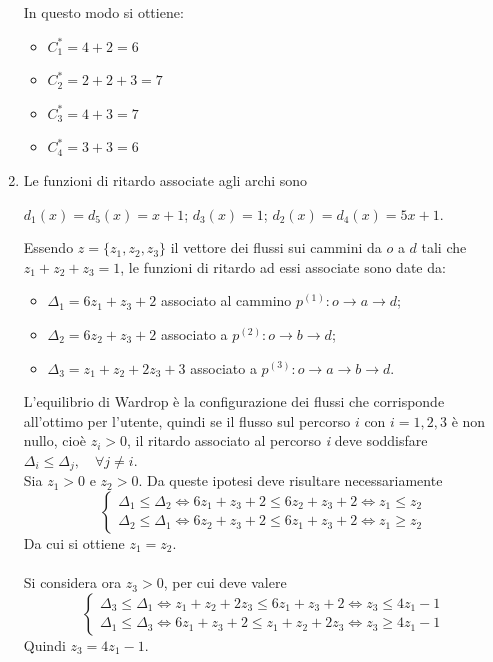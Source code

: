 \documentclass[13pt,largemargins]{homework}
\begin{document}
\begin{enumerate}[label=(\alph*)]
In questo modo si ottiene: 
\begin{itemize}
\item $C^*_1=4+2=6$
\item $C^*_2=2+2+3=7$
\item $C^*_3=4+3=7$
\item $C^*_4=3+3=6$\\
\end{itemize} 


\item %
Le funzioni di ritardo associate agli archi sono 
\begin{center}
	$d_1(x) = d_5(x) = x+1$; \quad $d_3(x) = 1$; \quad $d_2(x) = d_4(x) = 5x+1$.
\end{center}	
Essendo $z = \{z_1, z_2, z_3\}$ il vettore dei flussi sui cammini da \(o\) a \(d\)  tali che $z_1+z_2+z_3=1$, le funzioni di ritardo ad essi associate sono date da:
\begin{itemize}
\item $\Delta_1=6z_1+z_3+2$ associato al cammino $p^{(1)}: o\rightarrow a \rightarrow d$; 
\item $\Delta_2=6z_2+z_3+2$ associato a $p^{(2)}: o\rightarrow b \rightarrow d$; 
\item $\Delta_3=z_1+z_2+2z_3+3$ associato a  $p^{(3)}: o\rightarrow a\rightarrow b \rightarrow d$.\\
\end{itemize}
L'equilibrio di Wardrop è la configurazione dei flussi che corrisponde all'ottimo per l'utente, quindi se il flusso sul percorso \(i\) con \(i = 1,2,3\) è non nullo, cioè $z_i>0$, il ritardo associato al percorso \textit{i} deve soddisfare $\Delta_i\leq\Delta_j,\quad \forall j \neq i$.\\
Sia $z_1>0$ e $z_2>0$. Da queste ipotesi deve risultare necessariamente
\[\begin{cases} \Delta_1\leq \Delta_2 \Leftrightarrow 6z_1+z_3+2\leq 6z_2+z_3+2 \Leftrightarrow z_1\leq z_2\\ 
\Delta_2\leq \Delta_1 \Leftrightarrow 6z_2+z_3+2\leq 6z_1+z_3+2 \Leftrightarrow z_1\geq z_2\end{cases}\]
Da cui si ottiene $z_1=z_2$.\\\\
Si considera ora $z_3>0$, per cui deve valere 
\[\begin{cases} \Delta_3 \leq \Delta_1 \Leftrightarrow z_1+z_2+2z_3 \leq 6z_1+z_3+2 \Leftrightarrow z_3\leq 4z_1-1 \\ \Delta_1 \leq \Delta_3 \Leftrightarrow 6z_1+z_3+2 \leq z_1+z_2+2z_3\Leftrightarrow z_3\geq 4z_1-1\end{cases}\]
Quindi $z_3=4z_1-1$.


\end{enumerate}
\end{document}
